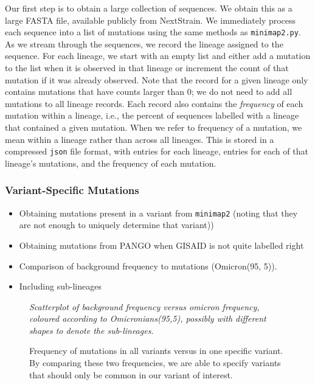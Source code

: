 \documentclass{article}
\newenvironment{tightemize}
{ \begin{itemize}
    \setlength{\itemsep}{0pt}
    \setlength{\parskip}{0pt}
    \setlength{\parsep}{0pt}     }
{ \end{itemize}                  }
\begin{document}
Our first step is to obtain a large collection of sequences.
We obtain this as a large FASTA file, available publicly from NextStrain.
We immediately process each sequence into a list of mutations using the same methods as \texttt{minimap2.py}.
As we stream through the sequences, we record the lineage assigned to the sequence.
For each lineage, we start with an empty list and either add a mutation to the list when it is observed in that lineage or increment the count of that mutation if it was already observed.
Note that the record for a given lineage only contains mutations that have counts larger than 0; we do not need to add all mutations to all lineage records.
Each record also contains the \emph{frequency} of each mutation within a lineage, i.e., the percent of sequences labelled with a lineage that contained a given mutation.
When we refer to frequency of a mutation, we mean within a lineage rather than across all lineages.
This is stored in a compressed \texttt{json} file format, with entries for each lineage, entries for each of that lineage's mutations, and the frequency of each mutation.



\subsubsection{Variant-Specific Mutations}

\begin{tightemize}
    \item Obtaining mutations present in a variant from \texttt{minimap2} (noting that they are not enough to uniquely determine that variant))
    \item Obtaining mutations from PANGO when GISAID is not quite labelled right
    \item Comparison of background frequency to mutations (Omicron(95, 5)). 
    \item Including sub-lineages
\end{tightemize}

\begin{figure}[ht!]
\vspace{2cm}
\centering
\emph{Scatterplot of background frequency versus omicron frequency, coloured according to Omicronians(95,5), possibly with different shapes to denote the sub-lineages.}
\vspace{2cm}
\caption{Frequency of mutations in all variants versus in one specific variant. By comparing these two frequencies, we are able to specify variants that should only be common in our variant of interest.}
\label{fig:mutation_frequency}
\end{figure}
\end{document}
